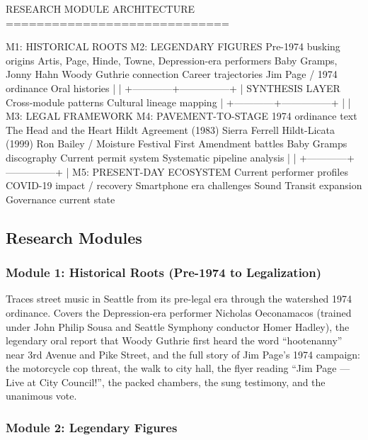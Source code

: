 \documentclass[11pt,letterpaper]{article}
\begin{document}
\begin{asciibox}
RESEARCH MODULE ARCHITECTURE
=============================

 M1: HISTORICAL ROOTS        M2: LEGENDARY FIGURES
 Pre-1974 busking origins     Artis, Page, Hinde, Towne,
 Depression-era performers    Baby Gramps, Jonny Hahn
 Woody Guthrie connection     Career trajectories
 Jim Page / 1974 ordinance    Oral histories
        |                            |
        +------------+---------------+
                     |
             SYNTHESIS LAYER
             Cross-module patterns
             Cultural lineage mapping
                     |
        +------------+---------------+
        |                            |
 M3: LEGAL FRAMEWORK         M4: PAVEMENT-TO-STAGE
 1974 ordinance text         The Head and the Heart
 Hildt Agreement (1983)      Sierra Ferrell
 Hildt-Licata (1999)         Ron Bailey / Moisture Festival
 First Amendment battles     Baby Gramps discography
 Current permit system       Systematic pipeline analysis
        |                            |
        +------------+---------------+
                     |
             M5: PRESENT-DAY ECOSYSTEM
             Current performer profiles
             COVID-19 impact / recovery
             Smartphone era challenges
             Sound Transit expansion
             Governance current state
\end{asciibox}

\subsection{Research Modules}

\subsubsection{Module 1: Historical Roots (Pre-1974 to Legalization)}

Traces street music in Seattle from its pre-legal era through the watershed 1974 ordinance. Covers the Depression-era performer Nicholas Oeconamacos (trained under John Philip Sousa and Seattle Symphony conductor Homer Hadley), the legendary oral report that Woody Guthrie first heard the word ``hootenanny'' near 3rd Avenue and Pike Street, and the full story of Jim Page's 1974 campaign: the motorcycle cop threat, the walk to city hall, the flyer reading ``Jim Page --- Live at City Council!'', the packed chambers, the sung testimony, and the unanimous vote.

\subsubsection{Module 2: Legendary Figures}
\end{document}

